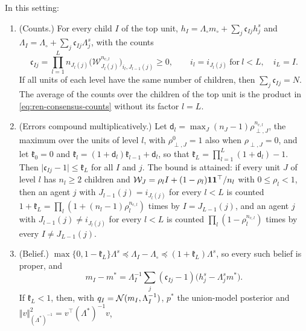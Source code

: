 \begin{proposition}\label{prop:ren-consensus-levels}
In this setting:
\begin{enumerate}
\item[(a)] (Counts.) For every child $I$ of the top unit, $h_I=\Lambda_\circ m_\circ+\sum_j\mathfrak c_{Ij}h^s_j$ and $\Lambda_I=\Lambda_\circ+\sum_j\mathfrak c_{Ij}\Lambda^s_j$, with the counts
\begin{equation}\label{eq:ren-consensus-counts}
\mathfrak c_{Ij}=\prod_{l=1}^Ln_{J_l(j)}\bigl(\mathcal W_{J_l(j)}^{n_{\mathrm c,l}}\bigr)_{i_l,J_{l-1}(j)}\ge0,\qquad i_l=i_{J_l(j)}\ \text{for}\ l<L,\quad i_L=I.
\end{equation}
If all units of each level have the same number of children, then $\sum_j\mathfrak c_{Ij}=N$. The average of the counts over the children of the top unit is the product in \eqref{eq:ren-consensus-counts} without its factor $l=L$.
\item[(b)] (Errors compound multiplicatively.) Let $\mathsf d_l=\max_J(n_J-1)\rho_{\perp,J}^{n_{\mathrm c,l}}$, the maximum over the units of level $l$, with $\rho_{\perp,J}^0=1$ also when $\rho_{\perp,J}=0$, and let $\mathfrak k_0=0$ and $\mathfrak k_l=(1+\mathsf d_l)\mathfrak k_{l-1}+\mathsf d_l$, so that $\mathfrak k_L=\prod_{l=1}^L(1+\mathsf d_l)-1$. Then $\lvert\mathfrak c_{Ij}-1\rvert\le\mathfrak k_L$ for all $I$ and $j$. The bound is attained: if every unit $J$ of level $l$ has $n_l\ge2$ children and $\mathcal W_J=\rho_lI+(1-\rho_l)\mathbf{1}\mathbf{1}^\top/n_l$ with $0\le\rho_l<1$, then an agent $j$ with $J_{l-1}(j)=i_{J_l(j)}$ for every $l<L$ is counted $1+\mathfrak k_L=\prod_l(1+(n_l-1)\rho_l^{n_{\mathrm c,l}})$ times by $I=J_{L-1}(j)$, and an agent $j$ with $J_{l-1}(j)\ne i_{J_l(j)}$ for every $l<L$ is counted $\prod_l(1-\rho_l^{n_{\mathrm c,l}})$ times by every $I\ne J_{L-1}(j)$.
\item[(c)] (Belief.) $\max\{0,1-\mathfrak k_L\}\Lambda^s\preceq\Lambda_I-\Lambda_\circ\preceq(1+\mathfrak k_L)\Lambda^s$, so every such belief is proper, and
\begin{equation}\label{eq:ren-consensus-mean}
m_I-m^\ast=\Lambda_I^{-1}\sum_j(\mathfrak c_{Ij}-1)\bigl(h^s_j-\Lambda^s_jm^\ast\bigr).
\end{equation}
If $\mathfrak k_L<1$, then, with $q_I=\mathcal{N}(m_I,\Lambda_I^{-1})$, $p^\ast$ the union-model posterior and $\Vert v\Vert^2_{(\Lambda^\ast)^{-1}}=v^\top(\Lambda^\ast)^{-1}v$,
\begin{equation}\label{eq:ren-consensus-kl}

\end{equation}
\end{enumerate}
\end{proposition}
